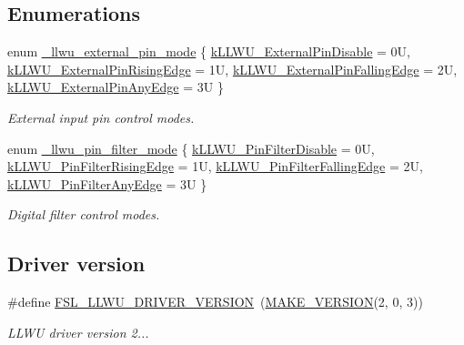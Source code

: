 \subsection*{Enumerations}
\begin{DoxyCompactItemize}
\item 
enum \mbox{\hyperlink{group__llwu_ga5b7fb066930b9abddc4de2d5431f1f46}{\+\_\+llwu\+\_\+external\+\_\+pin\+\_\+mode}} \{ \mbox{\hyperlink{group__llwu_gga5b7fb066930b9abddc4de2d5431f1f46a918f72033c61b0e9f5e83585ae76feea}{k\+L\+L\+W\+U\+\_\+\+External\+Pin\+Disable}} = 0U, 
\mbox{\hyperlink{group__llwu_gga5b7fb066930b9abddc4de2d5431f1f46a3d0358ae5f5e4e420efe998fce1c8b6c}{k\+L\+L\+W\+U\+\_\+\+External\+Pin\+Rising\+Edge}} = 1U, 
\mbox{\hyperlink{group__llwu_gga5b7fb066930b9abddc4de2d5431f1f46a2cc310ae58735aeaefe6f8822f2d4e0c}{k\+L\+L\+W\+U\+\_\+\+External\+Pin\+Falling\+Edge}} = 2U, 
\mbox{\hyperlink{group__llwu_gga5b7fb066930b9abddc4de2d5431f1f46a576c426077b7cc720ca746f5f1c27fa2}{k\+L\+L\+W\+U\+\_\+\+External\+Pin\+Any\+Edge}} = 3U
 \}
\begin{DoxyCompactList}\small\item\em External input pin control modes. \end{DoxyCompactList}\item 
enum \mbox{\hyperlink{group__llwu_ga04b013885364b1fc2c1e9d90e25ef067}{\+\_\+llwu\+\_\+pin\+\_\+filter\+\_\+mode}} \{ \mbox{\hyperlink{group__llwu_gga04b013885364b1fc2c1e9d90e25ef067ab1efbba59f0416cdb5f11563cbc86f8d}{k\+L\+L\+W\+U\+\_\+\+Pin\+Filter\+Disable}} = 0U, 
\mbox{\hyperlink{group__llwu_gga04b013885364b1fc2c1e9d90e25ef067a4247bc305c7b3b8c51c9fa54e6f3ab52}{k\+L\+L\+W\+U\+\_\+\+Pin\+Filter\+Rising\+Edge}} = 1U, 
\mbox{\hyperlink{group__llwu_gga04b013885364b1fc2c1e9d90e25ef067af429cb4dfc4343a66429baf2b8971279}{k\+L\+L\+W\+U\+\_\+\+Pin\+Filter\+Falling\+Edge}} = 2U, 
\mbox{\hyperlink{group__llwu_gga04b013885364b1fc2c1e9d90e25ef067a9ae5329e7b3fad4d4cdc447ca64c9ad2}{k\+L\+L\+W\+U\+\_\+\+Pin\+Filter\+Any\+Edge}} = 3U
 \}
\begin{DoxyCompactList}\small\item\em Digital filter control modes. \end{DoxyCompactList}\end{DoxyCompactItemize}
\subsection*{Driver version}
\begin{DoxyCompactItemize}
\item 
\mbox{\label{group__llwu_ga89a3dc773d6a05997c01e407561830b9}} 
\#define \mbox{\hyperlink{group__llwu_ga89a3dc773d6a05997c01e407561830b9}{F\+S\+L\+\_\+\+L\+L\+W\+U\+\_\+\+D\+R\+I\+V\+E\+R\+\_\+\+V\+E\+R\+S\+I\+ON}}~(\mbox{\hyperlink{group__ftfx__utilities_ga812138aa3315b0c6953c1a26130bcc37}{M\+A\+K\+E\+\_\+\+V\+E\+R\+S\+I\+ON}}(2, 0, 3))
\begin{DoxyCompactList}\small\item\em L\+L\+WU driver version 2... \end{DoxyCompactList}\end{DoxyCompactItemize}


